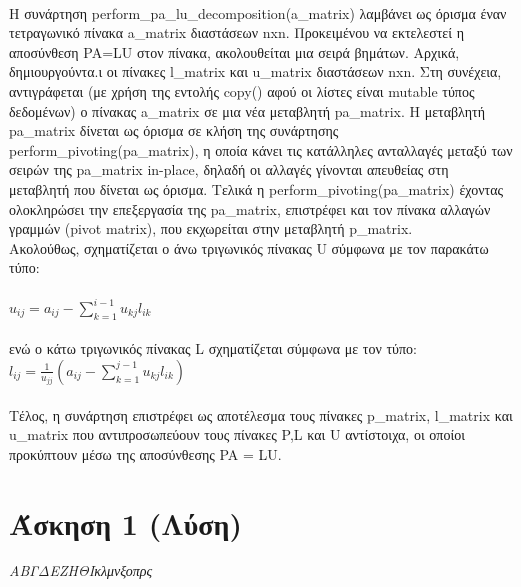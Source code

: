 \documentclass[a4paper,11pt]{article}
\newcommand{\lt}{\latintext}
\begin{document}
\\Η συνάρτηση {\lt perform\_pa\_lu\_decomposition(a\_matrix)} λαμβάνει ως όρισμα έναν τετραγωνικό πίνακα {\lt a\_matrix} διαστάσεων {\lt nxn}. Προκειμένου να εκτελεστεί η αποσύνθεση {\lt PA=LU} στον πίνακα, ακολουθείται μια σειρά βημάτων. Αρχικά, δημιουργούντα.ι οι πίνακες {\lt l\_matrix} και {\lt u\_matrix} διαστάσεων {\lt nxn}. Στη συνέχεια, αντιγράφεται (με χρήση της εντολής {\lt copy()} αφού οι λίστες είναι {\lt mutable} τύπος δεδομένων) ο πίνακας  {\lt a\_matrix} σε μια νέα μεταβλητή {\lt pa\_matrix}. Η μεταβλητή {\lt pa\_matrix} δίνεται ως όρισμα σε κλήση της συνάρτησης  {\lt perform\_pivoting(pa\_matrix)}, η οποία κάνει τις κατάλληλες ανταλλαγές μεταξύ των σειρών της {\lt pa\_matrix} {\lt in-place}, δηλαδή οι αλλαγές γίνονται απευθείας στη μεταβλητή που δίνεται ως όρισμα. Τελικά η {\lt perform\_pivoting(pa\_matrix)} έχοντας ολοκληρώσει την επεξεργασία της {\lt pa\_matrix}, επιστρέφει και τον πίνακα αλλαγών γραμμών {\lt (pivot matrix)}, που εκχωρείται στην μεταβλητή {\lt p\_matrix}.\\
Ακολούθως, σχηματίζεται ο άνω τριγωνικός πίνακας {\lt U} σύμφωνα με τον παρακάτω τύπο:\\
\\{$u_{ij} = a_{ij} - \sum_{k=1}^{i-1} u_{kj} l_{ik}$}\\
\\ενώ ο κάτω τριγωνικός πίνακας {\lt L} σχηματίζεται σύμφωνα με τον τύπο:\\
{$l_{ij} = \frac{1}{u_{jj}} (a_{ij} - \sum_{k=1}^{j-1} u_{kj} l_{ik} )$}\\
\\Τέλος, η συνάρτηση επιστρέφει ως αποτέλεσμα τους πίνακες {\lt p\_matrix}, {\lt l\_matrix} και {\lt u\_matrix} που αντιπροσωπεύουν τους πίνακες {\lt P},{\lt L} και {\lt U} αντίστοιχα, οι οποίοι προκύπτουν μέσω της αποσύνθεσης {\lt PA = LU}.





			
		

\section{Άσκηση 1 (Λύση)}
	
	\begin{center}
		\emph{{\tiny Α}{\scriptsize Β}{\footnotesize Γ}{\small Δ}{\normalsize Ε}{\large Ζ}{\Large Η}{\LARGE Θ}{\huge Ι}{\huge κ}{\LARGE λ}{\Large μ}{\large ν}{\normalsize ξ}{\small ο}{\footnotesize π}{\scriptsize ρ}{\tiny ς}}
	\end{center}
\end{document}
